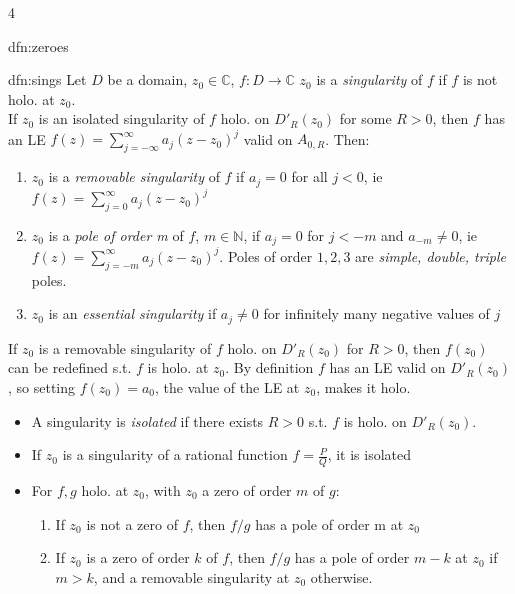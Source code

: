 \documentclass[landscape, 8pt]{extarticle}
\begin{document}
\begin{multicols*}{4}
\begin{dfn}[zeroes]{dfn:zeroes}{ }
\begin{itemize}
			\end{itemize}
			
		\end{dfn}
		
		
		\begin{dfn}[Singularities]{dfn:sings}{ }
			Let $D$ be a domain, $z_0 \in \mathbb{C}$, $f:D \to \mathbb{C}$
			$z_0$ is a \textit{singularity} of $f$ if $f$ is not holo. at $z_0$.\\			
			If $z_0$ is an isolated singularity of $f$ holo. on $D'_R(z_0)$ for some $R> 0$, then $f$ has an LE $f(z) = \sum_{j= -\infty}^{\infty}a_j(z-z_0)^j$ valid on $A_{0, R}$. Then:
			\begin{enumerate}[label=(\roman*)]
				\item $z_0$ is a \textit{removable singularity} of $f$ if $a_j = 0$ for all $j < 0$, ie $f(z) = \sum_{j=0}^{\infty}a_j(z-z_0)^j$
				\item $z_0$ is a \textit{pole of order m} of $f$, $m \in \mathbb{N}$, if $a_j = 0$ for $j < -m$ and $a_{-m} \ne 0$, ie $f(z) = \sum_{j= -m}^{\infty}a_j(z-z_0)^j$. Poles of order $1, 2, 3$ are \textit{simple, double, triple} poles.
				\item $z_0$ is an \textit{essential singularity} if $a_j \ne 0$ for infinitely many negative values of $j$
				
			\end{enumerate}
			
			If $z_0$ is a removable singularity of $f$ holo. on $D'_R(z_0)$ for $R > 0$, then $f(z_0)$ can be redefined s.t. $f$ is holo. at $z_0$. By definition $f$ has an LE valid on $D'_R(z_0)$, so setting $f(z_0) = a_0$, the value of the LE at $z_0$, makes it holo.
			
			\begin{itemize}
				\item A singularity is \textit{isolated} if there exists $R > 0$ s.t. $f$ is holo. on $D'_R(z_0)$.
				\item If $z_0$ is a singularity of a rational function $f = \frac{P}{Q}$, it is isolated
				\item For $f, g$ holo. at $z_0$, with $z_0$ a zero of order $m$ of $g$:
				\begin{enumerate}[label=(\roman*)]
					\item If $z_0$ is not a zero of $f$, then $f/g$ has a pole of order m at $z_0$
					\item If $z_0$ is a zero of order $k$ of $f$, then $f/g$ has a pole of order $m-k$ at $z_0$ if $m>k$, and a removable singularity at $z_0$ otherwise.
				\end{enumerate}
			\end{itemize}
			

\end{dfn}
\end{multicols*}
\end{document}
